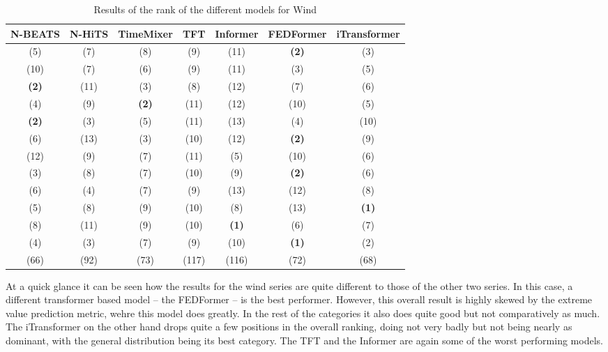 \begin{table}[ht]
    \footnotesize
    \begin{flushright}
    \begin{tabular}[r]{|ccc|cccc}
        \toprule
        N-BEATS&N-HiTS&TimeMixer&TFT&Informer&FEDFormer&iTransformer \\
        \midrule            
        (5)&(7)&(8)&(9)&(11)&\textbf{(2)}&(3) \\
        (10)&(7)&(6)&(9)&(11)&(3)&(5) \\
        \textbf{(2)}&(11)&(3)&(8)&(12)&(7)&(6) \\
        \midrule
        (4)&(9)&\textbf{(2)}&(11)&(12)&(10)&(5) \\
        \textbf{(2)}&(3)&(5)&(11)&(13)&(4)&(10) \\
        (6)&(13)&(3)&(10)&(12)&\textbf{(2)}&(9) \\
        \midrule
        (12)&(9)&(7)&(11)&(5)&(10)&(6) \\
        (3)&(8)&(7)&(10)&(9)&\textbf{(2)}&(6) \\
        (6)&(4)&(7)&(9)&(13)&(12)&(8) \\
        (5)&(8)&(9)&(10)&(8)&(13)&\textbf{(1)} \\
        (8)&(11)&(9)&(10)&\textbf{(1)}&(6)&(7) \\
        (4)&(3)&(7)&(9)&(10)&\textbf{(1)}&(2) \\
        \bottomrule
        (66)&(92)&(73)&(117)&(116)&(72)&(68) \\
        \bottomrule
    \end{tabular}
    \end{flushright}
    \caption{Results of the rank of the different models for Wind\label{long}}
    \label{table:results-rank-wind}
\end{table}

At a quick glance it can be seen how the results for the wind series are quite different to those of the other two series. In this case, a different transformer based model -- the FEDFormer -- is the best performer. However, this overall result is highly skewed by the extreme value prediction metric, wehre this model does greatly. In the rest of the categories it also does quite good but not comparatively as much. The iTransformer on the other hand drops quite a few positions in the overall ranking, doing not very badly but not being nearly as dominant, with the general distribution being its best category. The TFT and the Informer are again some of the worst performing models. 

